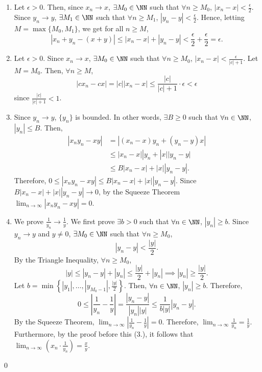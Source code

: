 \begin{enumerate}
    \item Let $\epsilon >0$. Then, since $x_n \to x$, $\exists M_0\in\NN$ such that $\forall n \geq M_0$, $|x_n-x|<\frac{\epsilon}{2}$. Since $y_n \to y$, $\exists M_1\in\NN$ such that $\forall n \geq M_1$, $|y_n - y|< \frac{\epsilon}{2}$. Hence, letting $M = \max\{M_0, M_1\}$, we get for all $n\geq M$, 
    \[
    |x_n+y_n - (x+y)| \leq |x_n -x| + |y_n -y| < \frac{\epsilon}{2} + \frac{\epsilon}{2} = \epsilon.
    \]
    \item Let $\epsilon>0$. Since $x_n \to x$, $\exists M_0\in\NN$ such that $\forall n \geq M_0$, $|x_n-x| < \frac{\epsilon}{|c|+1}$. Let $M=M_0$. Then, $\forall n\geq M$,
    \[
    |cx_n - cx| = |c| |x_n-x| \leq \frac{|c|}{|c|+1}\cdot \epsilon < \epsilon
    \]
    since $\frac{|c|}{|c|+1}<1$.
    \item Since $y_n\to y$, $\{y_n\}$ is bounded. In other words, $\exists B\geq  0$ such that $\forall n\in\NN$, $|y_n|\leq B$. Then,
    \begin{align*}
        |x_ny_n-xy| &= |(x_n-x)y_n + (y_n-y)x| \\
        &\leq |x_n-x| |y_n + |x||y_n-y| \\
        &\leq B|x_n-x| + |x||y_n-y|.
    \end{align*}
    Therefore, $0 \leq |x_ny_n - xy| \leq B|x_n-x| + |x||y_n-y|$. Since $B|x_n-x| + |x||y_n-y| \to 0$, by the Squeeze Theorem $\lim_{n\to \infty} |x_ny_n-xy| = 0$. 
    \item We prove $\frac{1}{y_n}\to \frac{1}{y}$. We first prove $\exists b>0$ such that $\forall n\in\NN$, $|y_n|\geq b$. Since $y_n\to y$ and $y\neq 0$, $\exists M_0\in\NN$ such that $\forall n\geq M_0$, 
    \[
    |y_n-y| < \frac{|y|}{2}.
    \]
    By the Triangle Inequality, $\forall n\geq M_0$,
    \[
    |y| \leq |y_n -y| + |y_n| \leq \frac{|y|}{2} + |y_n| \implies |y_n| \geq \frac{|y|}{2}.
    \]
    Let $b = \min\left\{|y_1|, \dots, |y_{M_0-1}|, \frac{|y|}{2}\right\}$. Then, $\forall n\in\NN$, $|y_n| \geq b.$ Therefore,
    \[
    0\leq \left|\frac{1}{y_n} - \frac{1}{y}\right| = \frac{|y_n -y|}{|y_n||y|} \leq \frac{1}{b|y|} |y_n-y|.
    \]
    By the Squeeze Theorem, $\lim_{n\to \infty} \left|\frac{1}{y_n} - \frac{1}{y}\right| = 0$. Therefore, $\lim_{n\to \infty}\frac{1}{y_n} = \frac{1}{y}$. Furthermore, by the proof before this (3.), it follows that $\lim_{n\to \infty} \left(x_n \cdot \frac{1}{y_n}\right) = \frac{x}{y}$.
\end{enumerate}
\qed 

